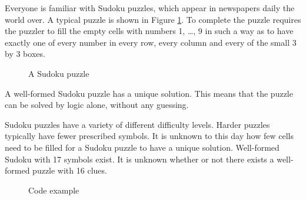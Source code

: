 Everyone is familiar with Sudoku puzzles, which appear in newspapers daily the world over. A typical puzzle is shown in Figure \ref{sudokuexampleone}. To complete the puzzle requires the puzzler to fill the empty cells with numbers 1, \ldots , 9 in such a way as to have exactly one of every number in every row, every column and every of the small 3 by 3 boxes.

\begin{figure}[h]
\label{sudokuexampleone}
\centering
  \sudokuexampleone
\caption{A Sudoku puzzle}
\end{figure}

A well-formed Sudoku puzzle has a unique solution. This means that the puzzle can be solved by logic alone, without any guessing.

Sudoku puzzles have a variety of different difficulty levels. Harder puzzles typically have fewer prescribed symbols. It is unknown to this day how few cells need to be filled for a Sudoku puzzle to have a unique solution. Well-formed Sudoku with 17 symbols exist. It is unknown whether or not there exists a well-formed puzzle with 16 clues.

\begin{figure}[h]

\caption{Code example}
\end{figure}
